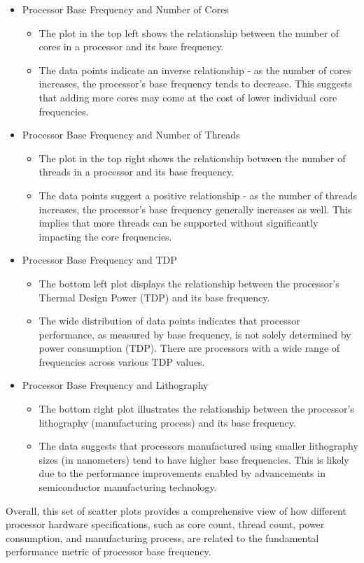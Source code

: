 \begin{itemize}
    \item Processor Base Frequency and Number of Cores
    \begin{itemize}
        \item The plot in the top left shows the relationship between the number of cores in a processor and its base frequency.
        \item The data points indicate an inverse relationship - as the number of cores increases, the processor's base frequency tends to decrease. This suggests that adding more cores may come at the cost of lower individual core frequencies.
    \end{itemize}

    \item Processor Base Frequency and Number of Threads
    \begin{itemize}
        \item The plot in the top right shows the relationship between the number of threads in a processor and its base frequency.
        \item The data points suggest a positive relationship - as the number of threads increases, the processor's base frequency generally increases as well. This implies that more threads can be supported without significantly impacting the core frequencies.
    \end{itemize}

    \item Processor Base Frequency and TDP
    \begin{itemize}
        \item The bottom left plot displays the relationship between the processor's Thermal Design Power (TDP) and its base frequency.
        \item The wide distribution of data points indicates that processor performance, as measured by base frequency, is not solely determined by power consumption (TDP). There are processors with a wide range of frequencies across various TDP values.
    \end{itemize}

    \item Processor Base Frequency and Lithography
    \begin{itemize}
        \item The bottom right plot illustrates the relationship between the processor's lithography (manufacturing process) and its base frequency.
        \item The data suggests that processors manufactured using smaller lithography sizes (in nanometers) tend to have higher base frequencies. This is likely due to the performance improvements enabled by advancements in semiconductor manufacturing technology.
    \end{itemize}
\end{itemize}
Overall, this set of scatter plots provides a comprehensive view of how different processor hardware specifications, such as core count, thread count, power consumption, and manufacturing process, are related to the fundamental performance metric of processor base frequency.

